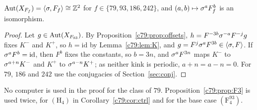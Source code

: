 \begin{theorem}\label{thm:79rigid}
$\operatorname{Aut}(X_{F_f})=\langle\sigma,F_f\rangle\cong\mathbb{Z}^2$ for $f\in\{79,93,186,242\}$, and $(a,b)\mapsto\sigma^aF_f^b$ is an isomorphism.
\end{theorem}

\begin{proof}
Let $g\in\operatorname{Aut}(X_{F_{93}})$. By Proposition~\ref{c79:prop:offsets}, $h=F^{-3b}\sigma^{-a}F^{-j}g$ fixes $K^-$ and $K^+$, so $h=\mathrm{id}$ by Lemma~\ref{c79:lem:K}, and $g=F^j\sigma^aF^{3b}\in\langle\sigma,F\rangle$. If $\sigma^aF^b=\mathrm{id}$, then $F^b$ fixes the constants, so $b=3n$, and $\sigma^aF^{3n}$ maps $K^-$ to $\sigma^{a+n}K^-$ and $K^+$ to $\sigma^{a-n}K^+$; as neither kink is periodic, $a+n=a-n=0$. For $79$, $186$ and $242$ use the conjugacies of Section~\ref{sec:conj}.
\end{proof}

No computer is used in the proof for the class of $79$. Proposition~\ref{c79:prop:F3} is used twice, for $(\mathrm H_4)$ in Corollary~\ref{c79:cor:ctrl} and for the base case $(\mathrm F^{93}_4)$.
